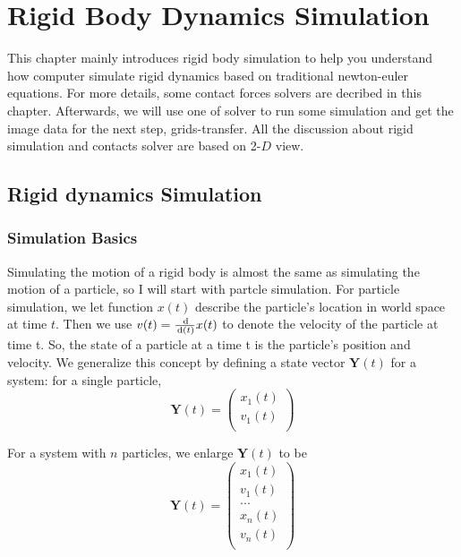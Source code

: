 \chapter{Rigid Body Dynamics Simulation}

This chapter mainly introduces rigid body simulation to help you understand how computer simulate rigid dynamics based on traditional newton-euler equations. For more details, some contact forces solvers are decribed in this chapter. Afterwards, we will use one of solver to run some simulation and get the image data for the next step, grids-transfer. All the discussion about rigid simulation and contacts solver are based on 2-$D$ view.

\section{Rigid dynamics Simulation}

\subsection{Simulation Basics}

Simulating the motion of a rigid body is almost the same as simulating the motion of a particle, so I will start with partcle simulation. For particle simulation, we let function $x(t)$ describe the particle's location in world space at time $t$. Then we use $v(t)=\frac{\,\mathrm{d}}{\,\mathrm{d}(t)}x(t)$
to denote the velocity of the particle at time t. So, the state of a particle at a time t is the particle's position and velocity. We generalize this concept by defining a state vector $\textbf{Y}(t)$ for a system: for a single particle,
\begin{equation}
    \textbf{Y}(t) = \left(
        \begin{array}{c}
            x_{1}(t) \\
            v_{1}(t) \\
        \end{array}
    \right)
\end{equation}

For a system with $n$ particles, we enlarge $\textbf{Y}(t)$ to be
\begin{equation}
    \textbf{Y}(t) = \left(
    \begin{array}{c}
        x_{1}(t) \\
        v_{1}(t) \\
        ... \\
        x_{n}(t) \\
        v_{n}(t) \\
    \end{array}
    \right)
\end{equation}

